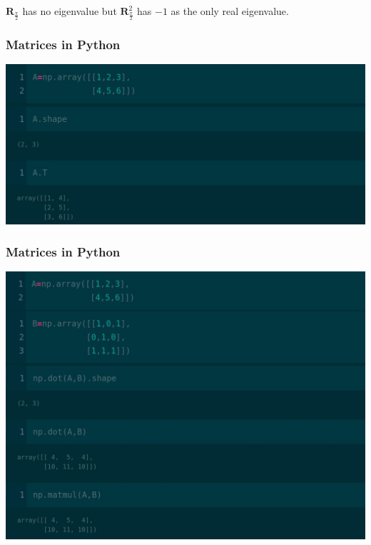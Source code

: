 \documentclass[12pt,aspectratio=169]{beamer}
\begin{document}
\begin{frame}
$\mathbf{R}_{\frac{\pi}{2}}$ has no eigenvalue but $\mathbf{R}_{\frac{\pi}{2}}^2$ has $-1$ as the only real eigenvalue.
\begin{figure}
\end{figure}
\end{frame}

\begin{frame}
\frametitle{Matrices in Python}
\begin{center}
\includegraphics[scale=0.3]{mat}
\end{center}
\end{frame}

\begin{frame}
\frametitle{Matrices in Python}
\begin{center}
\includegraphics[scale=0.3]{mat2}
\end{center}
\end{frame}
\end{document}
